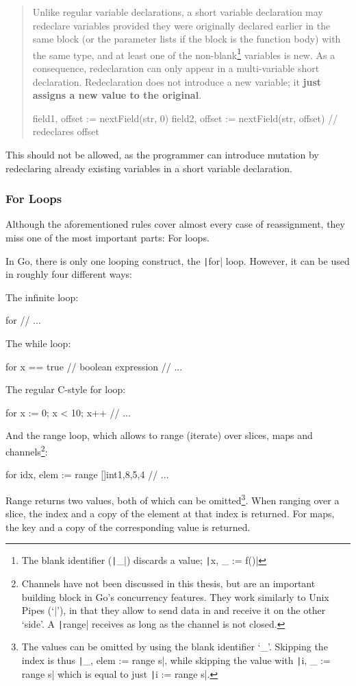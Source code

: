 \begin{quote}
Unlike regular variable declarations, a short variable declaration may redeclare
variables provided they were originally declared earlier in the same block (or
the parameter lists if the block is the function body) with the same type, and
at least one of the non-blank\footnote{The blank identifier (\texttt|_|)
    discards a value; \texttt|x, _ := f()|} variables is new. As a consequence, redeclaration
can only appear in a multi-variable short declaration. Redeclaration does not
introduce a new variable; it \textbf{just assigns a new value to the original}\autocite{short-hand-decl}.
    \begin{gocode}
field1, offset := nextField(str, 0)
field2, offset := nextField(str, offset)  // redeclares offset
    \end{gocode}
\end{quote}

This should not be allowed, as the programmer can introduce mutation by redeclaring
already existing variables in a short variable declaration.

\subsubsection{For Loops}

Although the aforementioned rules cover almost every case of reassignment, they miss
one of the most important parts: For loops.

In Go, there is only one looping construct, the \texttt|for| loop. However, it can
be used in roughly four different ways:

The infinite loop:
\begin{gocode}
for {
	// ...
}
\end{gocode}
The while loop:
\begin{gocode}
for x == true { // boolean expression
	// ...
}
\end{gocode}
The regular C-style for loop:
\begin{gocode}
for x := 0; x < 10; x++ {
	// ...
}
\end{gocode}
And the range loop, which allows to range (iterate) over slices, maps and channels\footnote{Channels
have not been discussed in this thesis, but are an important building block in Go's concurrency
features. They work similarly to Unix Pipes (`|'), in that they allow to send data in and receive
it on the other `side'. A \texttt|range| receives as long as the channel is not closed.}:
\begin{gocode}
for idx, elem := range []int{1,8,5,4} {
	// ...
}
\end{gocode}
Range returns two values, both of which can be omitted\footnote{The values can be omitted
    by using the blank identifier `\_'. Skipping the index is thus
    \texttt|_, elem := range s|, while skipping the value with
\texttt|i, _ := range s| which is equal to just \texttt|i := range s|.}. When
ranging over a slice, the index and a copy of the element at that index is returned. For
maps, the key and a copy of the corresponding value is returned.

